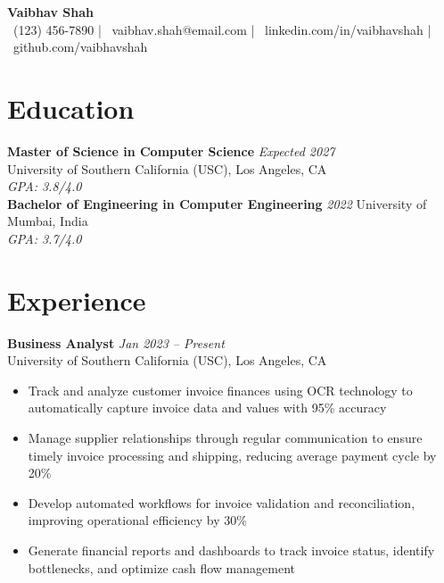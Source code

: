 \documentclass[11pt,a4paper]{article}
\begin{document}
\pagestyle{empty}

\begin{center}
    {\Huge \bfseries \color{primary} Vaibhav Shah} \\[8pt]
    \faPhone\ (123) 456-7890 \quad | \quad 
    \faEnvelope\ vaibhav.shah@email.com \quad | \quad 
    \faLinkedin\ linkedin.com/in/vaibhavshah \quad | \quad 
    \faGithub\ github.com/vaibhavshah
\end{center}

\vspace{10pt}

\section{Education}

\textbf{Master of Science in Computer Science} \hfill \textit{Expected 2027} \\
University of Southern California (USC), Los Angeles, CA \\
\textit{GPA: 3.8/4.0} \\[5pt]

\textbf{Bachelor of Engineering in Computer Engineering} \hfill \textit{2022} 
University of Mumbai, India \\
\textit{GPA: 3.7/4.0}

\vspace{10pt}

\section{Experience}

\textbf{Business Analyst} \hfill \textit{Jan 2023 -- Present} \\
University of Southern California (USC), Los Angeles, CA
\begin{itemize}
    \item Track and analyze customer invoice finances using OCR technology to automatically capture invoice data and values with 95\% accuracy
    \item Manage supplier relationships through regular communication to ensure timely invoice processing and shipping, reducing average payment cycle by 20\%
    \item Develop automated workflows for invoice validation and reconciliation, improving operational efficiency by 30\%
    \item Generate financial reports and dashboards to track invoice status, identify bottlenecks, and optimize cash flow management
\end{itemize}
\end{document}
